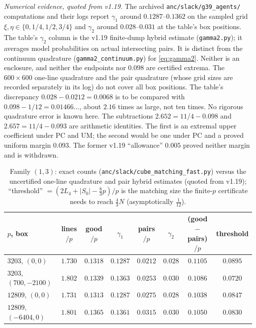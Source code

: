 \emph{Numerical evidence, quoted from v1.19.}
The archived \texttt{anc/slack/g39\_agents/} computations and their logs report $\gamma_1$ around $0.1287$--$0.1362$
on the sampled grid $\xi,\eta\in\{0,1/4,1/2,3/4\}$ and $\gamma_2$ around $0.028$--$0.031$ at the table's box positions.
The table's $\gamma_2$ column is the v1.19 finite-dump hybrid estimate (\texttt{gamma2.py}); it averages model probabilities on actual intersecting pairs.  It is distinct from the continuum quadrature (\texttt{gamma2\_continuum.py}) for \eqref{eq:gamma2}.  Neither is an enclosure, and neither the endpoints nor $0.098$ are certified extrema.
The $600\times600$ one-line quadrature and the pair quadrature (whose grid sizes are recorded separately in its log) do not cover all box positions.
The table's discrepancy $0.028-0.0212=0.0068$ is to be compared with $0.098-1/12=0.01466\ldots$, about $2.16$ times as large,
not ten times.  No rigorous quadrature error is known here.
The subtractions $2.652=11/4-0.098$ and $2.657=11/4-0.093$ are arithmetic identities.
The first is an extremal upper coefficient under PC and UM; the second would be one under PC and a proved uniform margin $0.093$.
The former v1.19 ``allowance'' $0.005$ proved neither margin and is withdrawn.

\begin{table}[ht]\centering\scriptsize
\begin{tabular}{lccccccc}
\toprule
$p$, box & lines$/p$ & good$/p$ & $\gamma_1$ & pairs$/p$ & $\gamma_2$ & (good$-$pairs)$/p$ & threshold\\
\midrule
$3203$, $(0,0)$        & $1.730$ & $0.1318$ & $0.1287$ & $0.0212$ & $0.028$ & $0.1105$ & $0.0895$\\
$3203$, $(700,-2100)$  & $1.802$ & $0.1339$ & $0.1363$ & $0.0253$ & $0.030$ & $0.1086$ & $0.0720$\\
$12809$, $(0,0)$       & $1.731$ & $0.1313$ & $0.1287$ & $0.0275$ & $0.028$ & $0.1038$ & $0.0847$\\
$12809$, $(-6404,0)$   & $1.801$ & $0.1365$ & $0.1361$ & $0.0315$ & $0.030$ & $0.1050$ & $0.0830$\\
\bottomrule
\end{tabular}
\caption{Family $(1,3)$: exact counts (\texttt{anc/slack/cube\_matching\_fast.py}) versus the uncertified one-line quadrature and pair hybrid estimates (quoted from v1.19); ``threshold'' $=(2L_4+|S_0|-\tfrac83p)/p$ is
the matching size the finite-$p$ certificate needs to reach $\tfrac43N$ (asymptotically $\tfrac1{12}$).}\label{tab:strong}
\end{table}

